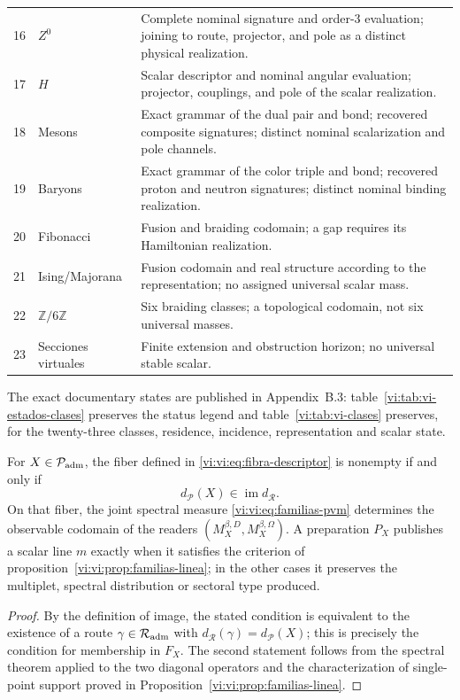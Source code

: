 \begin{longtable}{@{}p{.11\linewidth}p{.20\linewidth}p{.62\linewidth}@{}}
 16&\(Z^0\)&Complete nominal signature and order-\(3\) evaluation; joining to route, projector, and pole as a distinct physical realization.\\
 17&\(H\)&Scalar descriptor and nominal angular evaluation; projector, couplings, and pole of the scalar realization.\\
 18&Mesons&Exact grammar of the dual pair and bond; recovered composite signatures; distinct nominal scalarization and pole channels.\\
 19&Baryons&Exact grammar of the color triple and bond; recovered proton and neutron signatures; distinct nominal binding realization.\\
 20&Fibonacci&Fusion and braiding codomain; a gap requires its Hamiltonian realization.\\
 21&Ising/Majorana&Fusion codomain and real structure according to the representation; no assigned universal scalar mass.\\
 22&\(\mathbb Z/6\mathbb Z\)&Six braiding classes; a topological codomain, not six universal masses.\\
 23&Secciones virtuales&Finite extension and obstruction horizon; no universal stable scalar.\\
\end{longtable}

The exact documentary states are published in Appendix~B.3:
table~\ref{vi:tab:vi-estados-clases} preserves the status legend and
table~\ref{vi:tab:vi-clases} preserves, for the twenty-three classes, residence,
incidence, representation and scalar state.

\begin{proposition}
\label{vi:vi:prop:producto-fibrado-especie-ruta}
For \(X\in\mathcal P_{\rm adm}\), the fiber defined in
\eqref{vi:vi:eq:fibra-descriptor} is nonempty if and only if
\[
 d_{\mathcal P}(X)\in\operatorname{im}d_{\mathcal R}.
\]
On that fiber, the joint spectral measure
\eqref{vi:vi:eq:familias-pvm} determines the observable codomain of the readers
\((M_X^{\beta,D},M_X^{\beta,\Omega})\). A preparation \(P_X\) publishes a
scalar line \(m\) exactly when it satisfies the criterion of
proposition~\ref{vi:vi:prop:familias-linea}; in the other cases it preserves the
multiplet, spectral distribution or sectoral type produced.
\end{proposition}
\begin{proof}
By the definition of image, the stated condition is equivalent to the existence of
a route \(\gamma\in\mathcal R_{\rm adm}\) with
\(d_{\mathcal R}(\gamma)=d_{\mathcal P}(X)\); this is precisely the
condition for membership in \(F_X\). The second statement follows from the spectral
theorem applied to the two diagonal operators and the characterization
of single-point support proved in
Proposition~\ref{vi:vi:prop:familias-linea}.
\end{proof}

